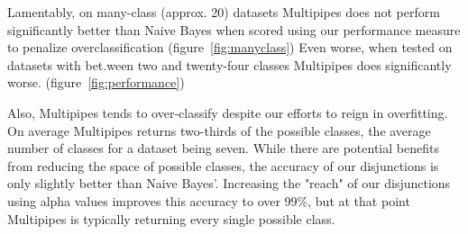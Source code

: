 Lamentably, on many-class (approx. 20) datasets Multipipes does not perform significantly better than Naive Bayes when scored using our performance measure to penalize overclassification (figure~\ref{fig:manyclass}) Even worse, when tested on datasets with bet.ween two and twenty-four classes Multipipes does significantly worse. (figure~\ref{fig:performance})


Also, Multipipes tends to over-classify despite our efforts to reign in overfitting. On average Multipipes returns two-thirds of the possible classes, the average number of classes for a dataset being seven. While there are potential benefits from reducing the space of possible classes, the accuracy of our disjunctions is only slightly better than Naive Bayes'. Increasing the "reach" of our disjunctions using alpha values improves this accuracy to over 99\%, but at that point Multipipes is typically returning every single possible class.

